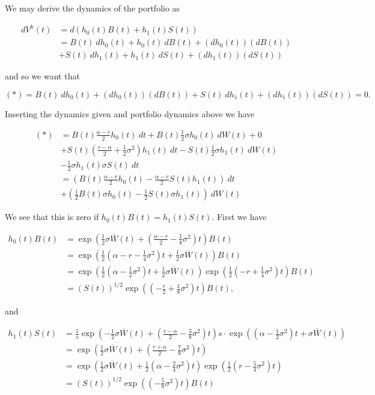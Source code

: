 \documentclass[
]{article}
\begin{document}
We may derive the dynamics of the portfolio as

\begin{align*}
dV^h(t)&=d(h_0(t)B(t)+h_1(t)S(t))\\
&=B(t)\ dh_0(t)+h_0(t)\ dB(t)+(dh_0(t))(dB(t))\\
&+S(t)\ dh_1(t)+h_1(t)\ dS(t)+(dh_1(t))(dS(t))
\end{align*}

and so we want that

\[
(*)=B(t)\ dh_0(t)+(dh_0(t))(dB(t))+S(t)\ dh_1(t)+(dh_1(t))(dS(t))=0.
\]

Inserting the dynamics given and portfolio dynamics above we have

\begin{align*}
(*)&=B(t)\frac{\alpha - r}{2}h_0(t)\ dt+B(t)\frac{1}{2}\sigma h_0(t)\ dW(t)+0\\
&+S(t)\left(\frac{r-\alpha}{2}+\frac{1}{2}\sigma^2\right)h_1(t)\ dt-S(t)\frac{1}{2}\sigma h_1(t)\ dW(t)\\
&-\frac{1}{2}\sigma h_1(t)\sigma S(t) \ dt\\
&=\left(B(t)\frac{\alpha - r}{2}h_0(t)-\frac{\alpha-r}{2}S(t)h_1(t)\right)\ dt\\
&+\left(\frac{1}{2}B(t)\sigma h_0(t)-\frac{1}{2}S(t)\sigma h_1(t)\right)\ dW(t)
\end{align*}

We see that this is zero if \(h_0(t)B(t)=h_1(t)S(t)\). First we have

\begin{align*}
h_0(t)B(t)&=\exp\left(\frac{1}{2}\sigma\overline{W}(t)+\left(\frac{\alpha - r}{2}-\frac{1}{8}\sigma^2\right)t\right)B(t)\\
&=\exp\left(\frac{1}{2}\left(\alpha - r-\frac{1}{4}\sigma^2\right)t+\frac{1}{2}\sigma\overline{W}(t)\right)B(t)\\
&=\exp\left(\frac{1}{2}\left(\alpha-\frac{1}{2}\sigma^2\right)t+\frac{1}{2}\sigma\overline{W}(t)\right)\exp\left(\frac{1}{2}\left( - r+\frac{1}{4}\sigma^2\right)t\right)B(t)\\
&=(S(t))^{1/2}\exp\left(\left(-\frac{r}{2}+\frac{1}{8}\sigma^2\right)t\right)B(t),
\end{align*}

and

\begin{align*}
h_1(t)S(t)&=\frac{1}{s}\exp\left(-\frac{1}{2}\sigma\overline{W}(t)+\left(\frac{r-\alpha}{2}-\frac{3}{8}\sigma^2\right)t\right)s\cdot\exp\left(\left(\alpha-\frac{1}{2}\sigma^2\right)t+\sigma\overline{W}(t)\right)\\
&=\exp\left(\frac{1}{2}\sigma\overline{W}(t)+\left(\frac{r+\alpha}{2}-\frac{7}{8}\sigma^2\right)t\right)\\
&=\exp\left(\frac{1}{2}\sigma\overline{W}(t)+\frac{1}{2}\left(\alpha-\frac{2}{4}\sigma^2\right)t\right)\exp\left(\frac{1}{2}\left(r-\frac{5}{4}\sigma^2\right)t\right)\\
&=(S(t))^{1/2}\exp\left(\left(-\frac{5}{8}\sigma^2\right)t\right)B(t)
\end{align*}
\end{document}
